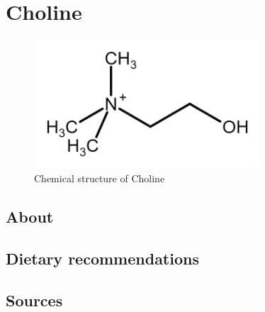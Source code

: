 \documentclass{book}
\begin{document}
\begin{sloppypar}
\chapter{Choline}
\begin{figure}[h]
	\caption{Chemical structure of Choline}
	\centering \includegraphics[width=0.75\textwidth]{images/Choline_chemical_structure}
\end{figure}
\newpage

\section{About}


\section{Dietary recommendations}


\section{Sources}
\end{sloppypar}


\listoffigures


\listoftables
\end{document}
